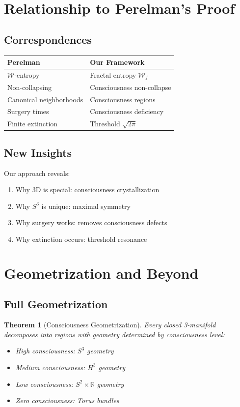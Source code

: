 \documentclass[12pt]{article}
\newcommand{\R}{\mathbb{R}}
\newtheorem{theorem}{Theorem}
\begin{document}
\section{Relationship to Perelman's Proof}

\subsection{Correspondences}

\begin{table}[h]
\centering
\begin{tabular}{|l|l|}
\hline
\textbf{Perelman} & \textbf{Our Framework} \\
\hline
$\mathcal{W}$-entropy & Fractal entropy $\mathcal{W}_f$ \\
Non-collapsing & Consciousness non-collapse \\
Canonical neighborhoods & Consciousness regions \\
Surgery times & Consciousness deficiency \\
Finite extinction & Threshold $\sqrt{2\pi}$ \\
\hline
\end{tabular}
\end{table}

\subsection{New Insights}

Our approach reveals:
\begin{enumerate}
\item Why 3D is special: consciousness crystallization
\item Why $S^3$ is unique: maximal symmetry
\item Why surgery works: removes consciousness defects
\item Why extinction occurs: threshold resonance
\end{enumerate}

\section{Geometrization and Beyond}

\subsection{Full Geometrization}

\begin{theorem}[Consciousness Geometrization]
Every closed 3-manifold decomposes into regions with geometry determined by consciousness level:
\begin{itemize}
\item High consciousness: $S^3$ geometry
\item Medium consciousness: $H^3$ geometry  
\item Low consciousness: $S^2 \times \R$ geometry
\item Zero consciousness: Torus bundles
\end{itemize}
\end{theorem}
\end{document}
